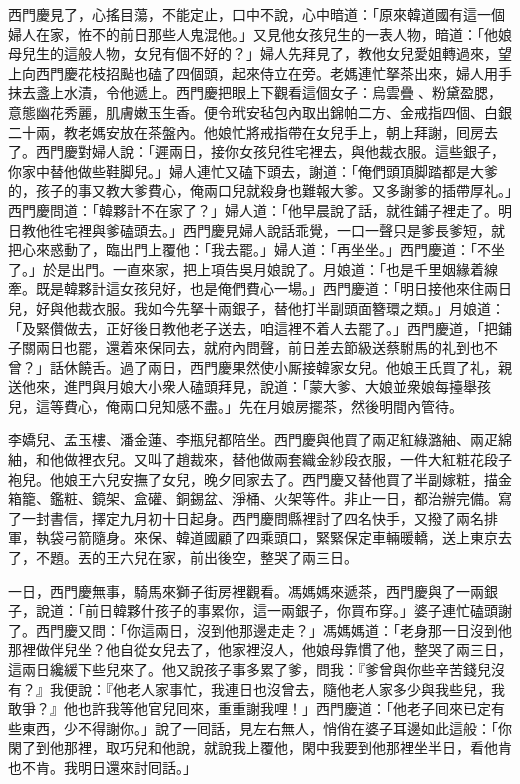 西門慶見了，心搖目蕩，不能定止，口中不說，心中暗道：「原來韓道國有這一個婦人在家，恠不的前日那些人鬼混他。」{}又見他女孩兒生的一表人物，暗道：「他娘母兒生的這般人物，女兒有個不好的？」婦人先拜見了，教他女兒愛姐轉過來，望上向西門慶花枝招颭也磕了四個頭，起來侍立在旁。老媽連忙拏茶出來，婦人用手抹去盞上水漬，令他遞上。西門慶把眼上下觀看這個女子：烏雲疊𩬆、粉黛盈腮，意態幽花秀麗，肌膚嫩玉生香。便令玳安毡包內取出錦帕二方、金戒指四個、白銀二十兩，教老媽安放在茶盤內。他娘忙將戒指帶在女兒手上，朝上拜謝，囘房去了。西門慶對婦人說：「遲兩日，接你女孩兒徃宅裡去，與他裁衣服。這些銀子，你家中替他做些鞋脚兒。」婦人連忙又磕下頭去，謝道：「俺們頭頂脚踏都是大爹的，孩子的事又教大爹費心，俺兩口兒就殺身也難報大爹。{}又多謝爹的插帶厚礼。」西門慶問道：「韓夥計不在家了？」婦人道：「他早晨說了話，就徃鋪子裡走了。明日教他徃宅裡與爹磕頭去。」西門慶見婦人說話乖覺，一口一聲只是爹長爹短，就把心來惑動了，臨出門上覆他：「我去罷。」婦人道：「再坐坐。」西門慶道：「不坐了。」{}於是出門。一直來家，把上項告吳月娘說了。月娘道：「也是千里姻緣着線牽。既是韓夥計這女孩兒好，也是俺們費心一場。」西門慶道：「明日接他來住兩日兒，好與他裁衣服。我如今先拏十兩銀子，替他打半副頭面簪環之類。」月娘道：「及緊儹做去，正好後日教他老子送去，咱這裡不着人去罷了。」西門慶道，「把鋪子關兩日也罷，還着來保同去，就府內問聲，前日差去節級送蔡駙馬的礼到也不曾？」話休饒舌。過了兩日，西門慶果然使小厮接韓家女兒。他娘王氏買了礼，親送他來，進門與月娘大小衆人磕頭拜見，說道：「蒙大爹、大娘並衆娘每擡舉孩兒，這等費心，俺兩口兒知感不盡。」先在月娘房擺茶，然後明間內管待。

李嬌兒、孟玉樓、潘金蓮、李瓶兒都陪坐。西門慶與他買了兩疋紅綠潞紬、兩疋綿紬，和他做裡衣兒。又叫了趙裁來，替他做兩套織金紗段衣服，一件大紅粧花段子袍兒。他娘王六兒安撫了女兒，晚夕囘家去了。西門慶又替他買了半副嫁粧，描金箱籠、鑑粧、鏡架、盒礶、銅錫盆、淨桶、火架等件。非止一日，都治辦完備。寫了一封書信，擇定九月初十日起身。西門慶問縣裡討了四名快手，又撥了兩名排軍，執袋弓箭隨身。來保、韓道國顧了四乘頭口，緊緊保定車輛暖轎，送上東京去了，不題。丟的王六兒在家，前出後空，整哭了兩三日。

一日，西門慶無事，騎馬來獅子街房裡觀看。馮媽媽來遞茶，西門慶與了一兩銀子，說道：「前日韓夥什孩子的事累你，這一兩銀子，你買布穿。」婆子連忙磕頭謝了。西門慶又問：「你這兩日，沒到他那邊走走？」馮媽媽道：「老身那一日沒到他那裡做伴兒坐？他自從女兒去了，他家裡沒人，他娘母靠慣了他，整哭了兩三日，這兩日纔緩下些兒來了。他又說孩子事多累了爹，問我：『爹曾與你些辛苦錢兒沒有？』我便說：『他老人家事忙，我連日也沒曾去，隨他老人家多少與我些兒，我敢爭？』他也許我等他官兒囘來，重重謝我哩！」西門慶道：「他老子囘來已定有些東西，少不得謝你。」說了一囘話，見左右無人，悄俏在婆子耳邊如此這般：「你閑了到他那裡，取巧兒和他說，就說我上覆他，閑中我要到他那裡坐半日，看他肯也不肯。我明日還來討囘話。」

